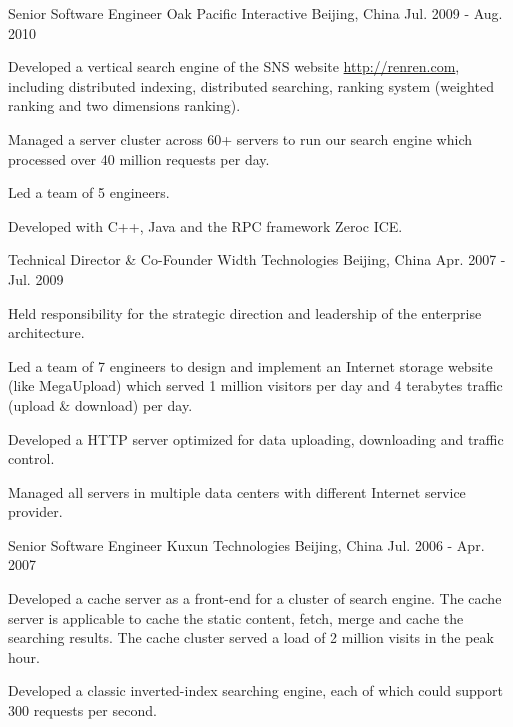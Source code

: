 \begin{cventries}
  \cventry
    {Senior Software Engineer} %
    {Oak Pacific Interactive} %
    {Beijing, China} %
    {Jul. 2009 - Aug. 2010} %
    {
      \begin{cvitems} %
        \item {Developed a vertical search engine of the SNS website \url{http://renren.com}, including distributed indexing, distributed searching, ranking system (weighted ranking and two dimensions ranking).}
        \item {Managed a server cluster across 60+ servers to run our search engine which processed over 40 million requests per day.}
        \item {Led a team of 5 engineers.}
        \item {Developed with C++, Java and the RPC framework Zeroc ICE.}
      \end{cvitems}
    }

  \cventry
    {Technical Director \& Co-Founder} %
    {Width Technologies} %
    {Beijing, China} %
    {Apr. 2007 - Jul. 2009} %
    {
      \begin{cvitems} %
        \item {Held responsibility for the strategic direction and leadership of the enterprise architecture.}
        \item {Led a team of 7 engineers to design and implement an Internet storage website (like MegaUpload) which served 1 million visitors per day and 4 terabytes traffic (upload \& download) per day.}
        \item {Developed a HTTP server optimized for data uploading, downloading and traffic control.}
        \item {Managed all servers in multiple data centers with different Internet service provider.}
      \end{cvitems}
    }

  \cventry
    {Senior Software Engineer} %
    {Kuxun Technologies} %
    {Beijing, China} %
    {Jul. 2006 - Apr. 2007} %
    {
      \begin{cvitems} %
        \item {Developed a cache server as a front-end for a cluster of search engine. The cache server is applicable to cache the static content, fetch, merge and cache the searching results. The cache cluster served a load of 2 million visits in the peak hour.}
        \item {Developed a classic inverted-index searching engine, each of which could support 300 requests per second.}
      \end{cvitems}
    }


\end{cventries}
